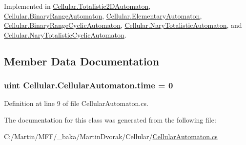 Implemented in \hyperlink{class_cellular_1_1_totalistic2_d_automaton_aa009c674cd109fa70173e9893f6d3b09}{Cellular.\+Totalistic2\+D\+Automaton}, \hyperlink{class_cellular_1_1_binary_range_automaton_afad205eb4fea51efd63b063f96bfda5c}{Cellular.\+Binary\+Range\+Automaton}, \hyperlink{class_cellular_1_1_elementary_automaton_a812677139d560e2c600226361b785995}{Cellular.\+Elementary\+Automaton}, \hyperlink{class_cellular_1_1_binary_range_cyclic_automaton_a75754d1c54550e1f29a9282647947cb8}{Cellular.\+Binary\+Range\+Cyclic\+Automaton}, \hyperlink{class_cellular_1_1_nary_totalistic_automaton_aa691c532a55638c7e3d0c125a4244773}{Cellular.\+Nary\+Totalistic\+Automaton}, and \hyperlink{class_cellular_1_1_nary_totalistic_cyclic_automaton_ac5c39cfb72386e3ab6132ab420091ae9}{Cellular.\+Nary\+Totalistic\+Cyclic\+Automaton}.



\subsection{Member Data Documentation}
\hypertarget{class_cellular_1_1_cellular_automaton_a6eaa8a9840fbc4c875d4e7d5a14e5f70}{}
\subsubsection[{time}]{\setlength{\rightskip}{0pt plus 5cm}uint Cellular.\+Cellular\+Automaton.\+time = 0\hspace{0.3cm}{\ttfamily [protected]}}\label{class_cellular_1_1_cellular_automaton_a6eaa8a9840fbc4c875d4e7d5a14e5f70}


Definition at line 9 of file Cellular\+Automaton.\+cs.



The documentation for this class was generated from the following file\+:\begin{DoxyCompactItemize}
\item 
C\+:/\+Martin/\+M\+F\+F/\+\_\+baka/\+Martin\+Dvorak/\+Cellular/\hyperlink{_cellular_automaton_8cs}{Cellular\+Automaton.\+cs}\end{DoxyCompactItemize}
